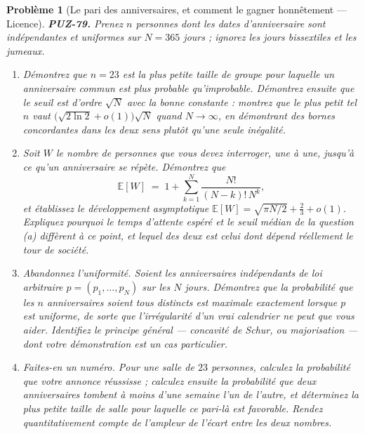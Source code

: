 \documentclass[11pt]{article}
\newtheorem{problem}{Problème}
\begin{document}
\begin{problem}[{Le pari des anniversaires, et comment le gagner honnêtement --- Licence}]
\textbf{PUZ-79.} Prenez $ n $ personnes dont les dates d'anniversaire sont
indépendantes et uniformes sur $ N = 365 $ jours ; ignorez les jours bissextiles et les
jumeaux.
\begin{enumerate}
\item[(a)] Démontrez que $ n = 23 $ est la plus petite taille de groupe pour laquelle un
anniversaire commun est plus probable qu'improbable. Démontrez ensuite que le seuil est
d'ordre $ \sqrt{N} $ avec la bonne constante : montrez que le plus petit tel $ n $ vaut
$ \big(\sqrt{2\ln 2} + o(1)\big)\sqrt{N} $ quand $ N \to \infty $, en démontrant des
bornes concordantes dans les deux sens plutôt qu'une seule inégalité.
\item[(b)] Soit $ W $ le nombre de personnes que vous devez interroger, une à une, jusqu'à ce
qu'un anniversaire se répète. Démontrez que
\[ \mathbb{E}[W] \;=\; 1 + \sum_{k=1}^{N} \frac{N!}{(N-k)!\,N^{k}}, \]
et établissez le développement asymptotique
$ \mathbb{E}[W] = \sqrt{\pi N/2} + \tfrac{2}{3} + o(1) $. Expliquez pourquoi le temps
d'attente espéré et le seuil médian de la question (a) diffèrent à ce point, et lequel des
deux est celui dont dépend réellement le tour de société.
\item[(c)] Abandonnez l'uniformité. Soient les anniversaires indépendants de loi arbitraire
$ p = (p_1, \dots, p_N) $ sur les $ N $ jours. Démontrez que la probabilité que les
$ n $ anniversaires soient tous distincts est maximale exactement lorsque $ p $ est
uniforme, de sorte que l'irrégularité d'un vrai calendrier ne peut que vous aider.
Identifiez le principe général --- concavité de Schur, ou majorisation --- dont votre
démonstration est un cas particulier.
\item[(d)] Faites-en un numéro. Pour une salle de $ 23 $ personnes, calculez la probabilité que
votre annonce réussisse ; calculez ensuite la probabilité que deux anniversaires tombent à
moins d'une semaine l'un de l'autre, et déterminez la plus petite taille de salle pour
laquelle \textit{ce} pari-là est favorable. Rendez quantitativement compte de l'ampleur de
l'écart entre les deux nombres.
\end{enumerate}

\end{problem}
\end{document}
